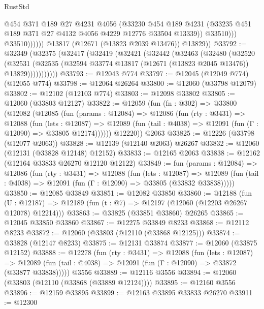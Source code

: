 \begin{lexlean}{RustStd}
\begin{coremodule}
                          @454
                          @371
                          @189
                          @27
                          @4231
                          @4056
                          (@33230
                            @454
                            @189
                            @4231
                            (@33235 @451 @189 @371 @27 @4132 @4056 @4229 @12776 @33504 @13339))
                          @33510)))
                    @33510))))))
        @13817
        (@12671 (@13823 @2039 @13476))
        @13829))
@33792 := @32349
    (@32375
      (@32417
        (@32419
          (@32421
            (@32442
              (@32463
                (@32480
                  (@32520
                    (@32531
                      (@32535 (@32594 @33774 @13817 (@12671 (@13823 @2045 @13476)) @13829)))))))))))
@33793 := @12043 @774
@33797 := @12045 (@12049 @774) (@12055 @774)
@33798 := @12064 @26264
@33800 := @12060 (@33798 @12079)
@33802 := @12102 (@12103 @774)
@33803 := @12098 @33802
@33805 := @12060 (@33803 @12127)
@33822 := @12059
    (fun (fn : @302) =>
    @33800
      (@12082
        (@12085
          (fun (params : @12084) =>
          @12086
            (fun (rty : @3431) =>
            @12088
              (fun (lets : @12087) =>
              @12089 (fun (tail : @4038) => @12091 (fun (Γ : @12090) => @33805 @12174))))))
        @12220))
    @2063
@33825 := @12226 (@33798 (@12077 @2063))
@33828 := @12139 (@12140 @2063) @26267
@33832 := @12060 (@12131 (@33828 @12148) @12152)
@33833 := @12165 @2063
@33838 := @12162 (@12164 @33833 @26270 @12120 @12122)
@33849 := fun (params : @12084) =>
  @12086
    (fun (rty : @3431) =>
    @12088
      (fun (lets : @12087) =>
      @12089 (fun (tail : @4038) => @12091 (fun (Γ : @12090) => @33805 (@33832 @33838)))))
@33850 := @12085 @33849
@33851 := @12082 @33850
@33860 := @12188
    (fun (U : @12187) => @12189 (fun (t : @7) => @12197 (@12060 (@12203 @26267 @12078) @12214)))
@33863 := @33825 (@33851 @33860) @26265
@33865 := @12045 @33850 @33860
@33867 := @12275 @33849 @8233
@33868 := @12112 @8233
@33872 := @12060 (@33803 (@12110 (@33868 @12125)))
@33874 := @33828 (@12147 @8233)
@33875 := @12131 @33874
@33877 := @12060 (@33875 @12152)
@33888 := @12278
    (fun (rty : @3431) =>
    @12088
      (fun (lets : @12087) =>
      @12089 (fun (tail : @4038) => @12091 (fun (Γ : @12090) => @33872 (@33877 @33838)))))
    @3556
@33889 := @12116 @3556
@33894 := @12060 (@33803 (@12110 (@33868 (@33889 @12124))))
@33895 := @12160 @3556
@33896 := @12159 @33895
@33899 := @12163 @33895 @33833 @26270
@33911 := @12300

\end{coremodule}
\end{lexlean}
